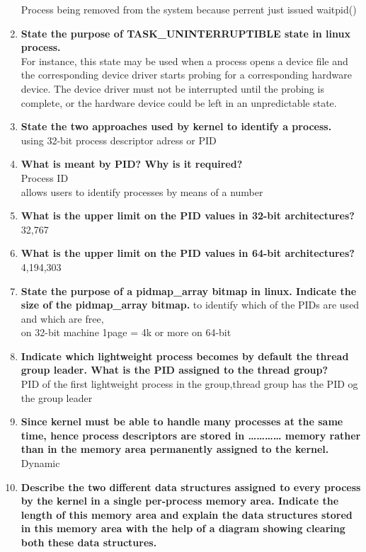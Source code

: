 \documentclass[a4paper,12pt]{article}
\begin{document}
\begin{flushleft}
\begin{enumerate}
{\color{red}Process being removed from the system because perrent just issued waitpid()}
\item \textbf{ State the purpose of TASK\_UNINTERRUPTIBLE state in linux process.}\\
{\color{red}For instance, this state may be used when a process opens a
device file and the corresponding device driver starts probing for a corresponding
hardware device. The device driver must not be interrupted until the probing is
complete, or the hardware device could be left in an unpredictable state.}
\item \textbf{ State the two approaches used by kernel to identify a process.\\}
{\color{red}using 32-bit process descriptor adress or PID}
\item \textbf{ What is meant by PID? Why is it required?\\}
{\color{red}Process ID\\allows users to identify processes by
means of a number}
\item \textbf{ What is the upper limit on the PID values in 32-bit architectures?}
{\color{red}32,767}
\item \textbf{ What is the upper limit on the PID values in 64-bit architectures?}
{\color{red}4,194,303}
\item \textbf{ State the purpose of a pidmap\_array bitmap in linux. Indicate the size of the pidmap\_array bitmap.}
{\color{red}to identify which of the PIDs are used and which are free,\\on 32-bit machine 1page = 4k or more on 64-bit}
\item \textbf{ Indicate which lightweight process becomes by default the thread group leader. What is the PID assigned to the thread group?\\}
{\color{red}PID of the first lightweight process in the group,thread group has the PID og the group leader}
\item \textbf{ Since kernel must be able to handle many processes at the same time, hence process descriptors are stored in ………… memory rather than in the memory area permanently assigned to the kernel.\\}
{\color{red}Dynamic}
\item \textbf{ Describe the two different data structures assigned to every process by the kernel in a single per-process memory area. Indicate the length of this memory area and explain the data structures stored in this memory area with the help of a diagram showing clearing both these data structures.\\}

\end{enumerate}
\end{flushleft}
\end{document}
